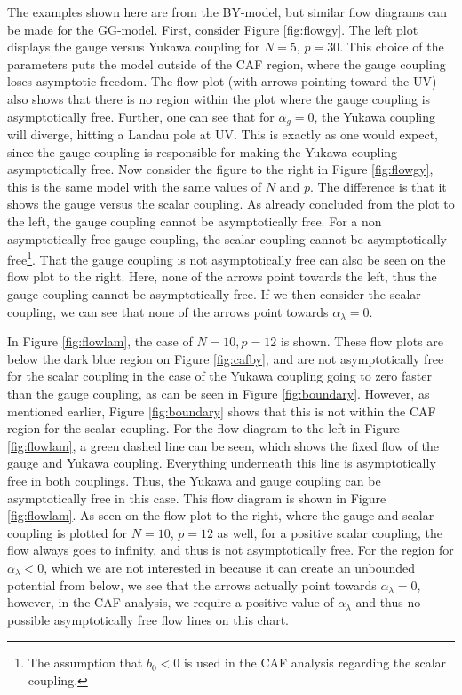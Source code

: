The examples shown here are from the BY-model, but similar flow diagrams can be made for the GG-model. First, consider Figure \ref{fig:flowgy}. The left plot displays the gauge versus Yukawa coupling for $N=5$, $p=30$. This choice of the parameters puts the model outside of the CAF region, where the gauge coupling loses asymptotic freedom. The flow plot (with arrows pointing toward the UV) also shows that there is no region within the plot where the gauge coupling is asymptotically free. Further, one can see that for $\alpha_g=0$, the Yukawa coupling will diverge, hitting a Landau pole at UV. This is exactly as one would expect, since the gauge coupling is responsible for making the Yukawa coupling asymptotically free. Now consider the figure to the right in Figure \ref{fig:flowgy}, this is the same model with the same values of $N$ and $p$. The difference is that it shows the gauge versus the scalar coupling. As already concluded from the plot to the left, the gauge coupling cannot be asymptotically free. For a non asymptotically free gauge coupling, the scalar coupling cannot be asymptotically free\footnote{The assumption that $b_0<0$ is used in the CAF analysis regarding the scalar coupling. }. That the gauge coupling is not asymptotically free can also be seen on the flow plot to the right. Here, none of the arrows point towards the left, thus the gauge coupling cannot be asymptotically free. If we then consider the scalar coupling, we can see that none of the arrows point towards $\alpha_\lambda=0$. 

In Figure \ref{fig:flowlam}, the case of $N=10,p=12$ is shown. These flow plots are below the dark blue region on Figure \ref{fig:cafby}, and are not asymptotically free for the scalar coupling in the case of the Yukawa coupling going to zero faster than the gauge coupling, as can be seen in Figure \ref{fig:boundary}. However, as mentioned earlier, Figure \ref{fig:boundary} shows that this is not within the CAF region for the scalar coupling. For the flow diagram to the left in Figure \ref{fig:flowlam}, a green dashed line can be seen, which shows the fixed flow of the gauge and Yukawa coupling. Everything underneath this line is asymptotically free in both couplings. Thus, the Yukawa and gauge coupling can be asymptotically free in this case. This flow diagram is shown in Figure \ref{fig:flowlam}. As seen on the flow plot to the right, where the gauge and scalar coupling is plotted for $N=10$, $p=12$ as well, for a positive scalar coupling, the flow always goes to infinity, and thus is not asymptotically free. For the region for $\alpha_\lambda<0$, which we are not interested in because it can create an unbounded potential from below, we see that the arrows actually point towards $\alpha_\lambda=0$, however, in the CAF analysis, we require a positive value of $\alpha_\lambda$ and thus no possible asymptotically free flow lines on this chart.

